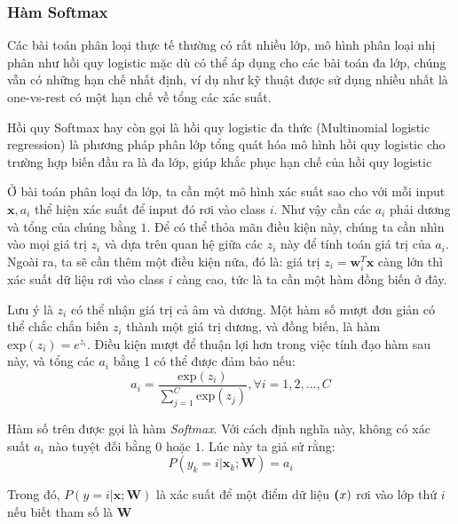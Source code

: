 \subsubsection{Hàm Softmax}
Các bài toán phân loại thực tế thường có rất nhiều lớp, mô hình phân loại nhị phân như hồi quy logistic mặc dù có thể áp dụng cho các bài toán đa lớp, chúng vẫn có những hạn chế nhất định, ví dụ như kỹ thuật được sử dụng nhiều nhất là one-vs-rest có một hạn chế về tổng các xác suất.

Hồi quy Softmax hay còn gọi là hồi quy logistic đa thức (Multinomial logistic regression) là phương pháp phân lớp tổng quát hóa mô hình hồi quy logistic cho trường hợp biến đầu ra là đa lớp, giúp khắc phục hạn chế của hồi quy logistic

Ở bài toán phân loại đa lớp, ta cần một mô hình xác suất sao cho với mỗi input $\textbf{x}, a_i$ thể hiện xác suất để input đó rơi vào class $i$. Như vậy cần các $a_i$ phải dương và tổng của chúng bằng $1$. Để có thể thỏa mãn điều kiện này, chúng ta cần nhìn vào mọi giá trị $z_i$ và dựa trên quan hệ giữa các $z_i$ này để tính toán giá trị của $a_i$. Ngoài ra, ta sẽ cần thêm một điều kiện nữa, đó là: giá trị $z_i = \textbf{w}^T_i\textbf{x}$ càng lớn thì xác suất dữ liệu rơi vào class $i$ càng cao, tức là ta cần một hàm đồng biến ở đây.

Lưu ý là $z_i$ có thể nhận giá trị cả âm và dương. Một hàm số mượt đơn giản có thể chắc chắn biến $z_i$ thành một giá trị dương, và đồng biến, là hàm $\text{exp}(z_i) = e^{z_i}$. Điều kiện mượt để thuận lợi hơn trong việc tính đạo hàm sau này, và tổng các $a_i$ bằng 1 có thể được đảm bảo nếu:
\begin{equation*}
    a_i = \frac{\text{exp}(z_i)}{\sum^C_{j=1}\text{exp}(z_j)}, \forall i = 1,2,\dots,C
\end{equation*}

Hàm số trên được gọi là hàm \emph{Softmax}. Với cách định nghĩa này, không có xác suất $a_i$ nào tuyệt đối bằng $0$ hoặc $1$.
Lúc này ta giả sử rằng:
\begin{equation*}
    P(y_k =i|\textbf{x}_k;\textbf{W}) = a_i
\end{equation*}

Trong đó, $P(y=i|\textbf{x};\textbf{W})$ là xác suất để một điểm dữ liệu $\textbf(x)$ rơi vào lớp thứ $i$ nếu biết tham số là $\textbf{W}$

